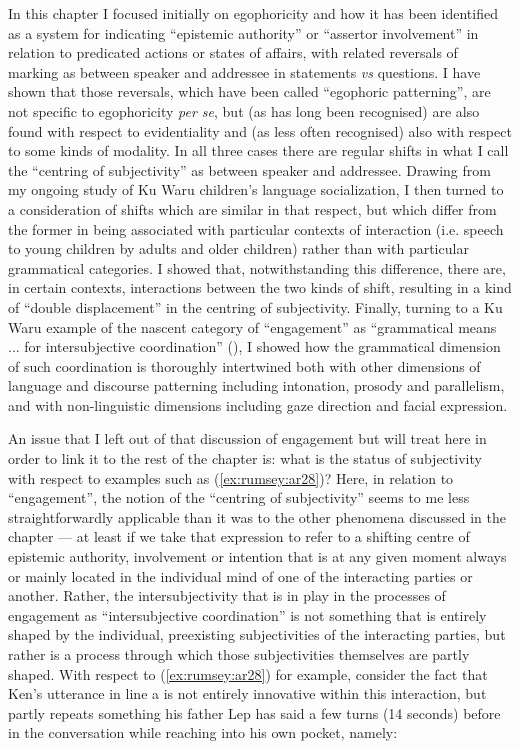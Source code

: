 \documentclass[output=paper]{langsci/langscibook}
\begin{document}
In this chapter I focused initially on egophoricity and how it has been identified as a system for indicating “epistemic authority” or “assertor involvement” in relation to predicated actions or states of affairs, with related reversals of marking as between speaker and addressee in statements \textit{vs} questions. I have shown that those reversals, which have been called “egophoric patterning”, are not specific to egophoricity \textit{per se}, but (as has long been recognised) are also found with respect to evidentiality and (as less often recognised) also with respect to some kinds of modality. In all three cases there are regular shifts in what I call the “centring of subjectivity” as between speaker and addressee. Drawing from my ongoing study of Ku Waru children’s language socialization, I then turned to a consideration of shifts which are similar in that respect, but which differ from the former in being associated with particular contexts of interaction (i.e. speech to young children by adults and older children) rather than with particular grammatical categories. I showed that, notwithstanding this difference, there are, in certain contexts, interactions between the two kinds of shift, resulting in a kind of “double displacement” in the centring of subjectivity.  Finally, turning to a Ku Waru example of the nascent category of “engagement” as “grammatical means ... for intersubjective coordination” (\citealt[112]{Evansetal2018}), I showed how the grammatical dimension of such coordination is thoroughly intertwined both with other dimensions of language and discourse patterning including intonation, prosody and parallelism, and with non-linguistic dimensions including gaze direction and facial expression.

An issue that I left out of that discussion of engagement but will treat here in order to link it to the rest of the chapter is: what is the status of subjectivity with respect to examples such as (\ref{ex:rumsey:ar28})? Here, in relation to “engagement”, the notion of the “centring of subjectivity” seems to me less straightforwardly applicable than it was to the other phenomena discussed in the chapter — at least if we take that expression to refer to a shifting centre of epistemic authority, involvement or intention that is at any given moment always or mainly located in the individual mind of one of the interacting parties or another. Rather, the intersubjectivity that is in play in the processes of engagement as “intersubjective coordination” is not something that is entirely shaped by the individual, preexisting subjectivities of the interacting parties, but rather is a process through which those subjectivities themselves are partly shaped. With respect to (\ref{ex:rumsey:ar28}) for example, consider the fact that Ken’s utterance in line a is not entirely innovative within this interaction, but partly repeats something his father Lep has said a few turns (14 seconds) before in the conversation while reaching into his own pocket, namely:
\end{document}
